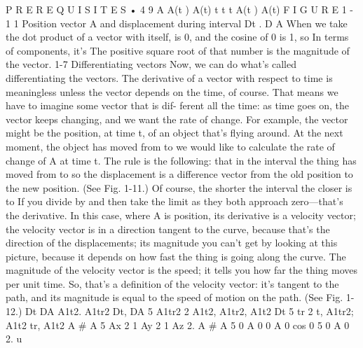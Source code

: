 \documentclass[10pt,oneside]{article}
\begin{document}
P R E R E Q U I S I T E S • 4 9 A   A(t )   A(t) t   t    t A(t ) A(t) F I G U R E 1 - 1 1 Position vector A and displacement during interval Dt . D A When we take the dot product of a vector with itself, is 0, and the cosine of 0 is 1, so In terms of components, it’s The positive square root of that number is the magnitude of the vector. 1-7 Differentiating vectors Now, we can do what’s called differentiating the vectors. The derivative of a vector with respect to time is meaningless unless the vector depends on the time, of course. That means we have to imagine some vector that is dif- ferent all the time: as time goes on, the vector keeps changing, and we want the rate of change. For example, the vector might be the position, at time t, of an object that’s flying around. At the next moment, the object has moved from to we would like to calculate the rate of change of A at time t. The rule is the following: that in the interval the thing has moved from to so the displacement is a difference vector from the old position to the new position. (See Fig. 1-11.) Of course, the shorter the interval the closer is to If you divide by and then take the limit as they both approach zero---that’s the derivative. In this case, where A is position, its derivative is a velocity vector; the velocity vector is in a direction tangent to the curve, because that’s the direction of the displacements; its magnitude you can’t get by looking at this picture, because it depends on how fast the thing is going along the curve. The magnitude of the velocity vector is the speed; it tells you how far the thing moves per unit time. So, that’s a definition of the velocity vector: it’s tangent to the path, and its magnitude is equal to the speed of motion on the path. (See Fig. 1-12.) Dt DA A1t2. A1tr2 Dt, DA 5 A1tr2 2 A1t2, A1tr2, A1t2 Dt 5 tr 2 t, A1tr2; A1t2 tr, A1t2 A \# A 5 Ax 2 1 Ay 2 1 Az 2. A \# A 5 0 A 0 0 A 0  cos 0 5 0 A 0 2. u\par
\end{document}
